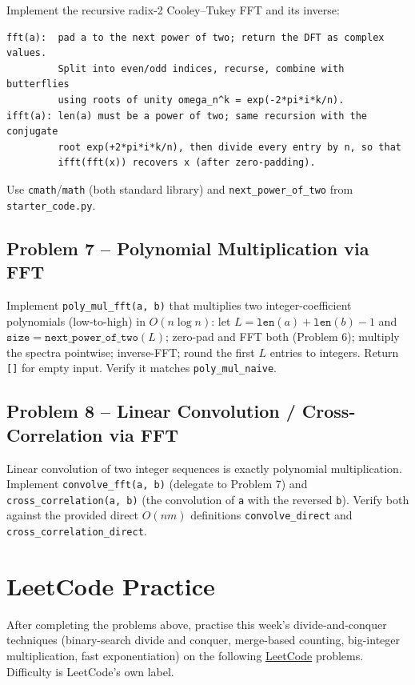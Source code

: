 \documentclass[11pt]{article}
\begin{document}
Implement the recursive radix-2 Cooley--Tukey FFT and its inverse:
\begin{verbatim}
fft(a):  pad a to the next power of two; return the DFT as complex values.
         Split into even/odd indices, recurse, combine with butterflies
         using roots of unity omega_n^k = exp(-2*pi*i*k/n).
ifft(a): len(a) must be a power of two; same recursion with the conjugate
         root exp(+2*pi*i*k/n), then divide every entry by n, so that
         ifft(fft(x)) recovers x (after zero-padding).
\end{verbatim}
Use \texttt{cmath}/\texttt{math} (both standard library) and \texttt{next\_power\_of\_two}
from \texttt{starter\_code.py}.

\subsection*{Problem 7 -- Polynomial Multiplication via FFT}

Implement \texttt{poly\_mul\_fft(a, b)} that multiplies two integer-coefficient polynomials
(low-to-high) in $O(n \log n)$: let $L = \texttt{len}(a) + \texttt{len}(b) - 1$ and
$\texttt{size} = \texttt{next\_power\_of\_two}(L)$; zero-pad and FFT both (Problem 6); multiply
the spectra pointwise; inverse-FFT; round the first $L$ entries to integers. Return \texttt{[]}
for empty input. Verify it matches \texttt{poly\_mul\_naive}.

\subsection*{Problem 8 -- Linear Convolution / Cross-Correlation via FFT}

Linear convolution of two integer sequences is exactly polynomial multiplication. Implement
\texttt{convolve\_fft(a, b)} (delegate to Problem 7) and \texttt{cross\_correlation(a, b)}
(the convolution of \texttt{a} with the reversed \texttt{b}). Verify both against the provided
direct $O(nm)$ definitions \texttt{convolve\_direct} and \texttt{cross\_correlation\_direct}.

\newpage
\section{LeetCode Practice}

After completing the problems above, practise this week's divide-and-conquer techniques
(binary-search divide and conquer, merge-based counting, big-integer multiplication, fast
exponentiation) on the following \href{https://leetcode.com}{LeetCode} problems. Difficulty is
LeetCode's own label.
\end{document}
